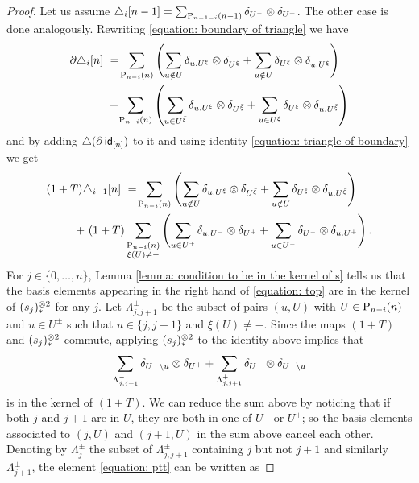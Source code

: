 \begin{proof}
	Let us assume $\triangle_i [n-1] = \sum_{\P_{n-1-i}(n-1)} \delta_{U^-} \ot \delta_{U^+}$. The other case is done analogously. Rewriting \eqref{equation: boundary of triangle} we have
    \begin{align*}
    \partial \triangle_i [n]\ & =\! \sum_{\P_{n-i}(n)} \left(\sum_{u \notin U} \delta_{u.U^\xi} \ot \delta_{U^{\bar{\xi}}} +
    \sum_{u \notin U} \delta_{U^\xi} \ot \delta_{u.U^{\bar{\xi}}} \right) \\ & +\!
    \sum_{\P_{n-i}(n)} \left(\sum_{u \in U^{\bar{\xi}}} \delta_{u.U^\xi} \ot \delta_{U^{\bar{\xi}}} +
    \sum_{u \in U^{\xi}} \delta_{U^\xi} \ot \delta_{u.U^{\bar{\xi}}} \right)
    \end{align*}
    and by adding $\triangle(\partial \, \id_{[n]})$ to it and using identity \eqref{equation: triangle of boundary} we get
    \begin{align}
    (1 + T) \triangle_{i-1} [n]\ & =\! \sum_{\P_{n-i}(n)} \left(\sum_{u \notin U} \delta_{u.U^\xi} \ot \delta_{U^{\bar{\xi}}} +
    \sum_{u \notin U} \delta_{U^\xi} \ot \delta_{u.U^{\bar{\xi}}} \right) \label{equation: top}\\ +\
    (1 + T) & \sum_{\substack{\P_{n-i}(n) \\ \xi(U) \neq -}} \left(\sum_{u \in U^+} \delta_{u.U^-} \ot \delta_{U^{+}} +
    \sum_{u \in U^-} \delta_{U^-} \ot \delta_{u.U^+} \right).
    \end{align}
    For $j \in \{0, \dots, n\}$, Lemma \ref{lemma: condition to be in the kernel of s} tells us that the basis elements appearing in the right hand of \eqref{equation: top} are in the kernel of $(s_j)_\ast^{\ot 2}$ for any $j$. Let $\Lambda_{j, j+1}^\pm$ be the subset of pairs $(u, U)$ with $U \in \P_{n-i}(n)$ and $u \in U^\pm$ such that $u \in \{j, j+1\}$ and $\xi(U) \neq -$. Since the maps $(1+T)$ and $(s_j)_\ast^{\ot 2}$ commute, applying $(s_j)_\ast^{\ot 2}$ to the identity above implies that
    \begin{equation} \label{equation: ptt}
    \sum_{\Lambda_{j, j+1}^-} \delta_{U^- \setminus u} \ot \delta_{U^+} +
    \sum_{\Lambda_{j, j+1}^+} \delta_{U^-} \ot \delta_{U^+ \setminus u}
    \end{equation}
    is in the kernel of $(1+T)$. We can reduce the sum above by noticing that if both $j$ and $j+1$ are in $U$, they are both in one of $U^-$ or $U^+$; so the basis elements associated to $(j, U)$ and $(j+1, U)$ in the sum above cancel each other. Denoting by $\Lambda^\pm_j$ the subset of $\Lambda^\pm_{j, j+1}$ containing $j$ but not $j+1$ and similarly $\Lambda^\pm_{j+1}$, the element \eqref{equation: ptt} can be written as

\end{proof}
